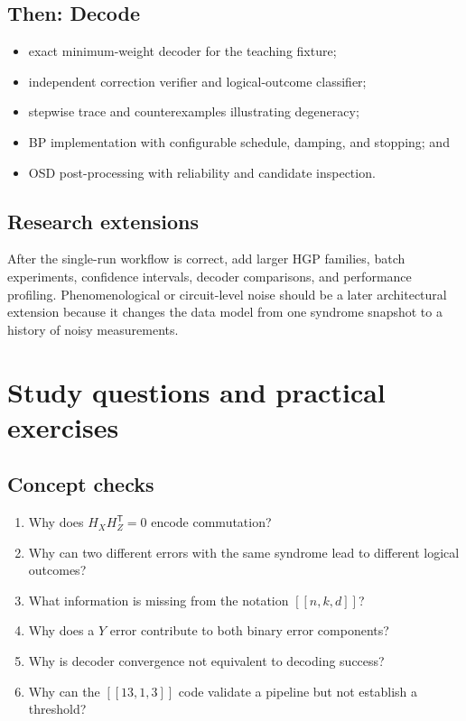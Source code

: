\documentclass[11pt,letterpaper]{article}
\begin{document}
\subsection{Then: Decode}

\begin{itemize}
  \item exact minimum-weight decoder for the teaching fixture;
  \item independent correction verifier and logical-outcome classifier;
  \item stepwise trace and counterexamples illustrating degeneracy;
  \item BP implementation with configurable schedule, damping, and stopping; and
  \item OSD post-processing with reliability and candidate inspection.
\end{itemize}

\subsection{Research extensions}

After the single-run workflow is correct, add larger HGP families, batch experiments, confidence
intervals, decoder comparisons, and performance profiling. Phenomenological or circuit-level noise
should be a later architectural extension because it changes the data model from one syndrome
snapshot to a history of noisy measurements.

\section{Study questions and practical exercises}

\subsection{Concept checks}

\begin{enumerate}
  \item Why does $H_XH_Z^{\mathsf T}=0$ encode commutation?
  \item Why can two different errors with the same syndrome lead to different logical outcomes?
  \item What information is missing from the notation $[[n,k,d]]$?
  \item Why does a $Y$ error contribute to both binary error components?
  \item Why is decoder convergence not equivalent to decoding success?
  \item Why can the $[[13,1,3]]$ code validate a pipeline but not establish a threshold?
\end{enumerate}
\end{document}
